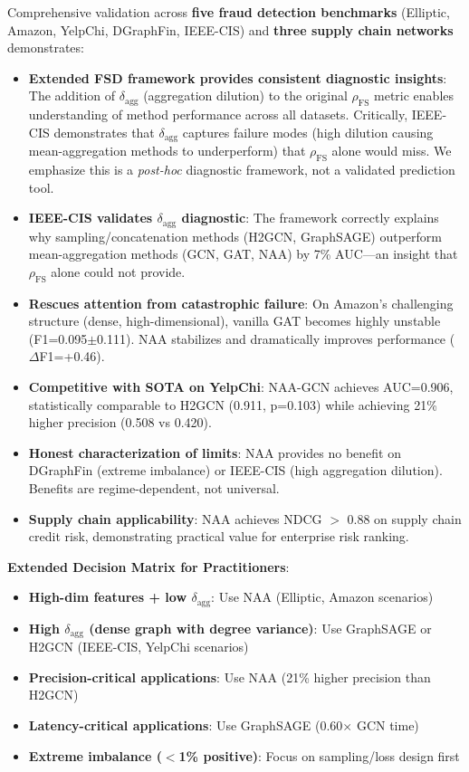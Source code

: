 Comprehensive validation across \textbf{five fraud detection benchmarks} (Elliptic, Amazon, YelpChi, DGraphFin, IEEE-CIS) and \textbf{three supply chain networks} demonstrates:

\begin{itemize}
\item \textbf{Extended FSD framework provides consistent diagnostic insights}: The addition of $\delta_{\text{agg}}$ (aggregation dilution) to the original $\rho_{\text{FS}}$ metric enables understanding of method performance across all datasets. Critically, IEEE-CIS demonstrates that $\delta_{\text{agg}}$ captures failure modes (high dilution causing mean-aggregation methods to underperform) that $\rho_{\text{FS}}$ alone would miss. We emphasize this is a \textit{post-hoc} diagnostic framework, not a validated prediction tool.

\item \textbf{IEEE-CIS validates $\delta_{\text{agg}}$ diagnostic}: The framework correctly explains why sampling/concatenation methods (H2GCN, GraphSAGE) outperform mean-aggregation methods (GCN, GAT, NAA) by 7\% AUC---an insight that $\rho_{\text{FS}}$ alone could not provide.

\item \textbf{Rescues attention from catastrophic failure}: On Amazon's challenging structure (dense, high-dimensional), vanilla GAT becomes highly unstable (F1=0.095$\pm$0.111). NAA stabilizes and dramatically improves performance ($\Delta$F1=+0.46).

\item \textbf{Competitive with SOTA on YelpChi}: NAA-GCN achieves AUC=0.906, statistically comparable to H2GCN (0.911, p=0.103) while achieving 21\% higher precision (0.508 vs 0.420).

\item \textbf{Honest characterization of limits}: NAA provides no benefit on DGraphFin (extreme imbalance) or IEEE-CIS (high aggregation dilution). Benefits are regime-dependent, not universal.

\item \textbf{Supply chain applicability}: NAA achieves NDCG $>$ 0.88 on supply chain credit risk, demonstrating practical value for enterprise risk ranking.
\end{itemize}

\textbf{Extended Decision Matrix for Practitioners}:
\begin{itemize}
\item \textbf{High-dim features + low $\delta_{\text{agg}}$}: Use NAA (Elliptic, Amazon scenarios)
\item \textbf{High $\delta_{\text{agg}}$ (dense graph with degree variance)}: Use GraphSAGE or H2GCN (IEEE-CIS, YelpChi scenarios)
\item \textbf{Precision-critical applications}: Use NAA (21\% higher precision than H2GCN)
\item \textbf{Latency-critical applications}: Use GraphSAGE (0.60$\times$ GCN time)
\item \textbf{Extreme imbalance ($<$1\% positive)}: Focus on sampling/loss design first
\end{itemize}

